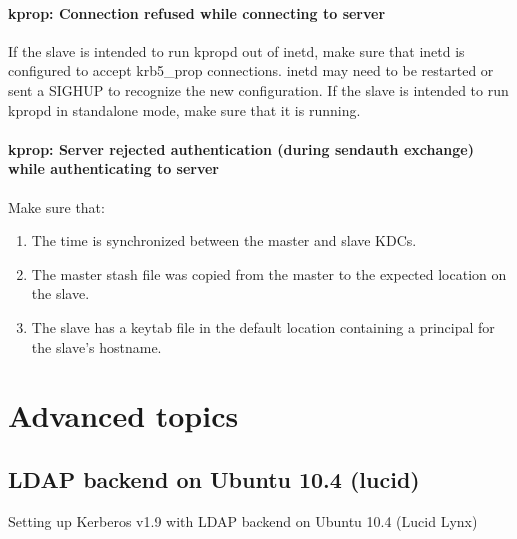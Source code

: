 \documentclass[letterpaper,10pt,english]{sphinxmanual}
\begin{document}
\subsubsection{kprop: Connection refused while connecting to server}
\label{admin/troubleshoot:kprop-connection-refused-while-connecting-to-server}\label{admin/troubleshoot:kprop-con-refused}
If the slave is intended to run kpropd out of inetd, make sure that
inetd is configured to accept krb5\_prop connections.  inetd may need
to be restarted or sent a SIGHUP to recognize the new configuration.
If the slave is intended to run kpropd in standalone mode, make sure
that it is running.


\subsubsection{kprop: Server rejected authentication (during sendauth exchange) while authenticating to server}
\label{admin/troubleshoot:kprop-sendauth-exchange}\label{admin/troubleshoot:kprop-server-rejected-authentication-during-sendauth-exchange-while-authenticating-to-server}
Make sure that:
\begin{enumerate}
\item {} 
The time is synchronized between the master and slave KDCs.

\item {} 
The master stash file was copied from the master to the expected
location on the slave.

\item {} 
The slave has a keytab file in the default location containing a
 principal for the slave's hostname.

\end{enumerate}


\chapter{Advanced topics}
\label{admin/advanced/index:advanced-topics}\label{admin/advanced/index::doc}

\section{LDAP backend on Ubuntu 10.4 (lucid)}
\label{admin/advanced/ldapbackend:ldap-backend-on-ubuntu-10-4-lucid}\label{admin/advanced/ldapbackend::doc}\label{admin/advanced/ldapbackend:ldap-be-ubuntu}
Setting up Kerberos v1.9 with LDAP backend on Ubuntu 10.4 (Lucid Lynx)
\end{document}
